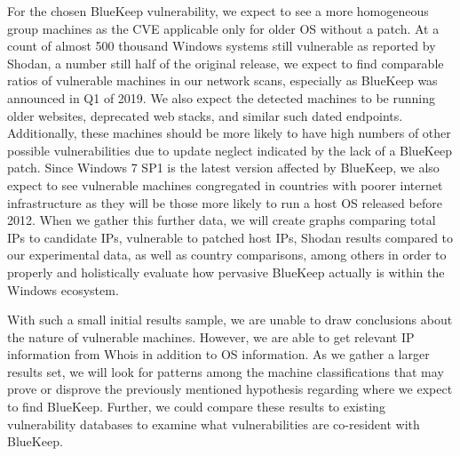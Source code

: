 For the chosen BlueKeep vulnerability, we expect to see a more homogeneous group machines as the CVE applicable only for older OS without a patch. At a count of almost 500 thousand Windows systems still vulnerable as reported by Shodan, a number still half of the original release, we expect to find comparable ratios of vulnerable machines in our network scans, especially as BlueKeep was announced in Q1 of 2019. We also expect the detected machines to be running older websites, deprecated web stacks, and similar such dated endpoints. Additionally, these machines should be more likely to have high numbers of other possible vulnerabilities due to update neglect indicated by the lack of a BlueKeep patch. Since Windows 7 SP1 is the latest version affected by BlueKeep, we also expect to see vulnerable machines congregated in countries with poorer internet infrastructure as they will be those more likely to run a host OS released before 2012. When we gather this further data, we will create graphs comparing total IPs to candidate IPs, vulnerable to patched host IPs, Shodan results compared to our experimental data, as well as country comparisons, among others in order to properly and holistically evaluate how pervasive BlueKeep actually is within the Windows ecosystem.

With such a small initial results sample, we are unable to draw conclusions about the nature of vulnerable machines. However, we are able to get relevant IP information from Whois in addition to OS information. As we gather a larger results set, we will look for patterns among the machine classifications that may prove or disprove the previously mentioned hypothesis regarding where we expect to find BlueKeep. Further, we could compare these results to existing vulnerability databases to examine what vulnerabilities are co-resident with BlueKeep.